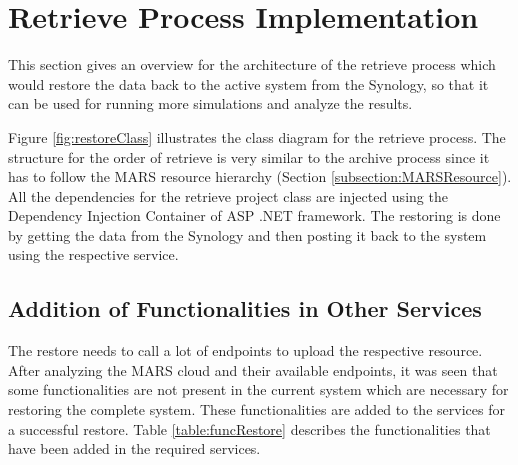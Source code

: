 \section{Retrieve Process Implementation}
This section gives an overview for the architecture of the retrieve process which would restore the data back to the active
system from the Synology, so that it can be used for running more simulations and analyze the results. 

Figure \ref{fig:restoreClass} illustrates the class diagram for the retrieve process. The structure for the order of retrieve is very similar to the archive process
since it has to follow the MARS resource hierarchy (Section \ref{subsection:MARSResource}). All the dependencies for the retrieve project class are injected
using the Dependency Injection Container of ASP .NET framework. The restoring is done by getting the data from the Synology and then posting it back to the system
using the respective service.

\subsection{Addition of Functionalities in Other Services}
The restore needs to call a lot of endpoints to upload the respective resource. After analyzing the MARS cloud and their available endpoints, it was
seen that some functionalities are not present in the current system which are necessary for restoring the complete system. These functionalities are
added to the services for a successful restore. Table \ref{table:funcRestore} describes the functionalities that have been
added in the required services.

